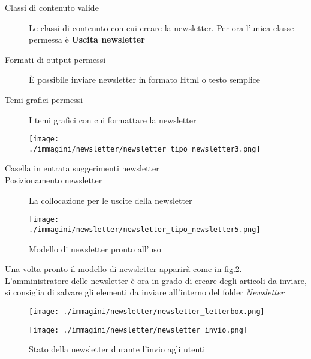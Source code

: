 \begin{description}
\item[Classi di contenuto valide] Le classi di contenuto con cui creare la newsletter. Per ora l'unica classe permessa è \textbf{Uscita newsletter}
\item[Formati di output permessi] È possibile inviare newsletter in formato Html o testo semplice
\item[Temi grafici permessi]I temi grafici con cui formattare la newsletter
\end{description}



\begin{figure}[H]
 \centering
 \texttt{[image: ./immagini/newsletter/newsletter\_tipo\_newsletter3.png]}
 \label{fig:newsletter_type4}
\end{figure}

\begin{description}
 \item [Casella in entrata suggerimenti newsletter]
\item[Posizionamento newsletter]La collocazione per le uscite della newsletter
\end{description}



\begin{figure}[H]
 \centering
 \texttt{[image: ./immagini/newsletter/newsletter\_tipo\_newsletter5.png]}
\caption{Modello di newsletter pronto all'uso}
\label{fig:newsletter_type5}
\end{figure}


Una volta pronto il modello di newsletter apparirà come in fig.\ref{fig:newsletter_type5}. L'amministratore delle newsletter è ora in grado di creare degli articoli da inviare, si consiglia di salvare gli elementi da inviare all'interno del folder \textsl{Newsletter}

\begin{figure}[H]
 \centering
 \texttt{[image: ./immagini/newsletter/newsletter\_letterbox.png]}
 \label{fig:newsletter_letterbox}
\end{figure}


\begin{figure}[H]
 \centering
 \texttt{[image: ./immagini/newsletter/newsletter\_invio.png]}
 \caption{Stato della newsletter durante l'invio agli utenti}
 \label{fig:newsletter_invio}
\end{figure}

